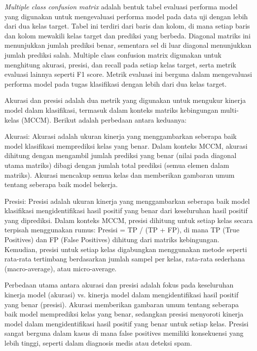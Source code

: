 \textit{Multiple class confusion matrix} adalah bentuk tabel evaluasi performa model yang digunakan untuk mengevaluasi performa model pada data uji dengan lebih dari dua kelas target. Tabel ini terdiri dari baris dan kolom, di mana setiap baris dan kolom mewakili kelas target dan prediksi yang berbeda. Diagonal matriks ini menunjukkan jumlah prediksi benar, sementara sel di luar diagonal menunjukkan jumlah prediksi salah. Multiple class confusion matrix digunakan untuk menghitung akurasi, presisi, dan recall pada setiap kelas target, serta metrik evaluasi lainnya seperti F1 score. Metrik evaluasi ini berguna dalam mengevaluasi performa model pada tugas klasifikasi dengan lebih dari dua kelas target.

Akurasi dan presisi adalah dua metrik yang digunakan untuk mengukur kinerja model dalam klasifikasi, termasuk dalam konteks matriks kebingungan multi-kelas (MCCM). Berikut adalah perbedaan antara keduanya:

Akurasi:
Akurasi adalah ukuran kinerja yang menggambarkan seberapa baik model klasifikasi memprediksi kelas yang benar. Dalam konteks MCCM, akurasi dihitung dengan mengambil jumlah prediksi yang benar (nilai pada diagonal utama matriks) dibagi dengan jumlah total prediksi (semua elemen dalam matriks). Akurasi mencakup semua kelas dan memberikan gambaran umum tentang seberapa baik model bekerja.

Presisi:
Presisi adalah ukuran kinerja yang menggambarkan seberapa baik model klasifikasi mengidentifikasi hasil positif yang benar dari keseluruhan hasil positif yang diprediksi. Dalam konteks MCCM, presisi dihitung untuk setiap kelas secara terpisah menggunakan rumus: Presisi = TP / (TP + FP), di mana TP (True Positives) dan FP (False Positives) dihitung dari matriks kebingungan. Kemudian, presisi untuk setiap kelas digabungkan menggunakan metode seperti rata-rata tertimbang berdasarkan jumlah sampel per kelas, rata-rata sederhana (macro-average), atau micro-average.

Perbedaan utama antara akurasi dan presisi adalah fokus pada keseluruhan kinerja model (akurasi) vs. kinerja model dalam mengidentifikasi hasil positif yang benar (presisi). Akurasi memberikan gambaran umum tentang seberapa baik model memprediksi kelas yang benar, sedangkan presisi menyoroti kinerja model dalam mengidentifikasi hasil positif yang benar untuk setiap kelas. Presisi sangat berguna dalam kasus di mana false positives memiliki konsekuensi yang lebih tinggi, seperti dalam diagnosis medis atau deteksi spam.

